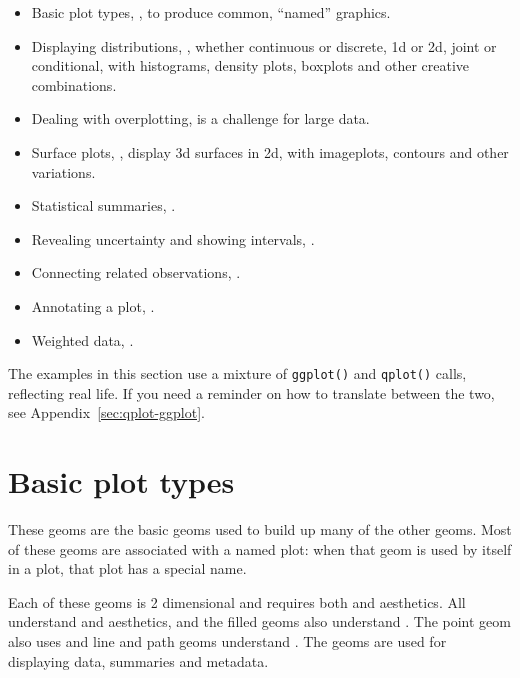 \begin{itemize}
  \item Basic plot types, , to produce common, ``named'' graphics.
  
  \item Displaying distributions, , whether continuous or discrete, 1d or 2d, joint or conditional, with histograms, density plots, boxplots and other creative combinations.
  
  \item Dealing with overplotting,  is a challenge for large data.

  \item Surface plots, , display 3d surfaces in 2d, with imageplots, contours and other variations.

  \item Statistical summaries, .

  \item Revealing uncertainty and showing intervals, .

  \item Connecting related observations, .

  \item Annotating a plot, .

  \item Weighted data, .
\end{itemize}


The examples in this section use a mixture of {\tt ggplot()} and {\tt qplot()} calls, reflecting real life.  If you need a reminder on how to translate between the two, see Appendix~\ref{sec:qplot-ggplot}.

\section{Basic plot types}\label{sec:basics}

These geoms are the basic geoms used to build up many of the other geoms.  Most of these geoms are associated with a named plot: when that geom is used by itself in a plot, that plot has a special name.

Each of these geoms is 2 dimensional and requires both  and  aesthetics.  All understand  and  aesthetics, and the filled geoms also understand .  The point geom also uses  and line and path geoms understand . The geoms are used for displaying data, summaries and metadata.

